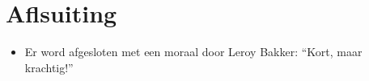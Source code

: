 \documentclass{article}
\begin{document}
\section{Aflsuiting}

\begin{itemize}
\item Er word afgesloten met een moraal door Leroy Bakker: ``Kort, maar krachtig!''
\end{itemize}
\end{document}
